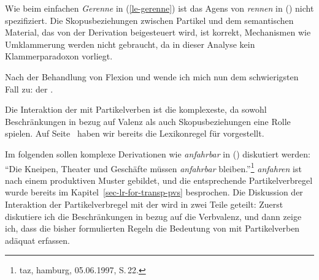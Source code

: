 \noindent
Wie beim einfachen \emph{Gerenne} in (\ref{le-gerenne}) ist das
Agens von \emph{rennen} in () nicht spezifiziert. 
Die Skopusbeziehungen zwischen Partikel und dem semantischen Material,
das von der Derivation beigesteuert wird, ist korrekt, Mechanismen
wie Umklammerung werden nicht gebraucht, da in dieser Analyse kein
Klammerparadoxon vorliegt.

\begin{comment}
The derivation with object predicatives and resultatives is completely analogous:
The rule in (\ref{lr-gee-nom}) is applied to the lexical entry for the object predicative
\emph{find}- (`find') producing \stem{gefinde}, which is then combined with 
\emph{schön} (`beautiful') to yield \emph{Schöngefinde}\iw{Schöngefinde} (`beautiful.finding').
In the case of resultative constructions, the listed entry for \emph{schlag}- (`to hit')
is fed into the lexical rule (\ref{lr-result}) for resultative constructions.
The output of this rule is the input to (\ref{lr-gee-nom}), yielding
\stem{geschlage}, which is then combined with \emph{tot} (`dead'),
resulting in \word{Totgeschlage} (`dead.beating').
\end{comment}

Nach der Behandlung von Flexion und \geen wende ich mich nun
dem schwierigsten Fall zu: der \bard.

\label{sec-bard-pv}

Die\iw{\bars|(}%
Interaktion der \bard mit Partikelverben ist die
komplexeste, da sowohl Beschränkungen in bezug auf Valenz
als auch Skopusbeziehungen eine Rolle spielen.
Auf Seite~\pageref{lr-bar-adj} haben wir bereits die
Lexikonregel  für \bard vorgestellt.

Im folgenden sollen komplexe Derivationen wie \emph{anfahrbar}
in () diskutiert werden:
\ea
 "`Die Kneipen,        Theater  und Geschäfte müssen \emph{anfahrbar} bleiben."'\footnote{
taz, hamburg, 05.06.1997, S.\,22.%
}
\z
\emph{anfahren} ist nach einem produktiven Muster gebildet, und die entsprechende
Partikelverbregel wurde bereits im Kapitel~\ref{sec-lr-for-transp-pvs} besprochen.
Die Diskussion der Interaktion der Partikelverbregel mit der \bard wird in zwei Teile geteilt: Zuerst
diskutiere ich die Beschränkungen in bezug auf die Verbvalenz, und dann zeige ich,
dass die bisher formulierten Regeln die Bedeutung von \barden mit Partikelverben adäquat
erfassen.

